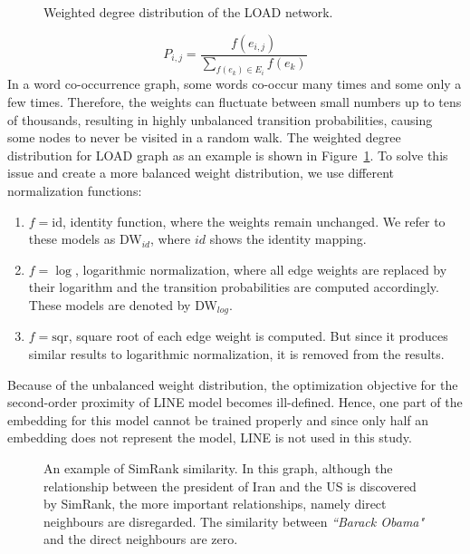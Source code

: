 \begin{figure}
\centering 
\resizebox{0.6\textwidth}{0.6\textwidth}{      

}
\caption{Weighted degree distribution of the LOAD network.}
\label{fig:degrees}
\end{figure}
\begin{equation}
P_{i,j}=\frac{f(e_{i,j})}{\sum _{ f(e_ k )\in E_{ i } }^{  }{ f(e_k) } }
\label{eq:edge_weight}
\end{equation}
In a word co-occurrence graph, some words co-occur many times and some only a few times. Therefore, the weights can fluctuate between small numbers up to tens of thousands, resulting in highly unbalanced transition probabilities, causing some nodes to never be visited in a random walk. The weighted degree distribution for LOAD graph as an example is shown in Figure~\ref{fig:degrees}. To solve this issue and create a more balanced weight distribution, we use different normalization functions:
\noindent
\begin{enumerate}
\item  $f=\mathrm{id}$, identity function, where the weights remain unchanged. We refer to these models as DW$_{id}$, where $id$ shows the identity mapping.
\item  $f=\log$, logarithmic normalization, where all edge weights are replaced by their logarithm and the transition probabilities are computed accordingly. These models are denoted by DW$_{log}$.
\item  $f=\mathrm{sqr}$, square root of each edge weight is computed. But since it produces similar results to logarithmic normalization, it is removed from the results.
\end{enumerate}
\noindent
Because of the unbalanced weight distribution, the optimization objective for the second-order proximity of LINE model becomes ill-defined. Hence, one part of the embedding for this model cannot be trained properly and since only half an embedding does not represent the model, LINE is not used in this study.\\
\begin{figure}
\centering 
\resizebox{0.50\textwidth}{0.35\textwidth}{      

}
\caption{An example of SimRank similarity. In this graph, although the relationship between the president of Iran and the US is discovered by SimRank, the more important relationships, namely direct neighbours are disregarded. The similarity between \emph{``Barack Obama"} and the direct neighbours are zero.}
\label{fig:simrank}
\end{figure}
